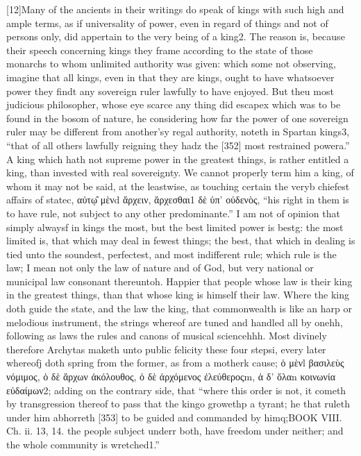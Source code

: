 [12]Many of the ancients in their writings do speak of kings with such high and ample terms, as if universality of power, even in regard of things and not of persons only, did appertain to the very being of a king2. The reason is, because their speech concerning kings they frame according to the state of those monarchs to whom unlimited authority was given: which some not observing, imagine that all kings, even in that they are kings, ought to have whatsoever power they findt any sovereign ruler lawfully to have enjoyed. But theu most judicious philosopher, whose eye scarce any thing did escapex which was to be found in the bosom of nature, he considering how far the power of one sovereign ruler may be different from another’sy regal authority, noteth in Spartan kings3, “that of all others lawfully reigning they hadz the [352] most restrained powera.” A king which hath not supreme power in the greatest things, is rather entitled a king, than invested with real sovereignty. We cannot properly term him a king, of whom it may not be said, at the leastwise, as touching certain the veryb chiefest affairs of statec, αὐτῳ̑ μὲνd ἄρχειν, ἄρχεσθαι1 δὲ ὑπ’ οὐδενὸς, “his right in them is to have rule, not subject to any other predominante.” I am not of opinion that simply alwaysf in kings the most, but the best limited power is bestg: the most limited is, that which may deal in fewest things; the best, that which in dealing is tied unto the soundest, perfectest, and most indifferent rule; which rule is the law; I mean not only the law of nature and of God, but very national or municipal law consonant thereuntoh. Happier that people whose law is their king in the greatest things, than that whose king is himself their law. Where the king doth guide the state, and the law the king, that commonwealth is like an harp or melodious instrument, the strings whereof are tuned and handled all by onehh, following as laws the rules and canons of musical sciencehhh. Most divinely therefore Archytas maketh unto public felicity these four stepsi, every later whereofj doth spring from the former, as from a motherk cause; ὁ μὲνl βασιλεὺς νόμιμος, ὁ δὲ ἄρχων ἀκόλουθος, ὁ δὲ ἀρχόμενος ἐλεύθεροςm, ἁ δ’ ὅλαn κοινωνία εὐδαίμων2; adding on the contrary side, that “where this order is not, it cometh by transgression thereof to pass that the kingo growethp a tyrant; he that ruleth under him abhorreth [353] to be guided and commanded by himq;BOOK VIII. Ch. ii. 13, 14. the people subject underr both, have freedom under neither; and the whole community is wretched1.”

